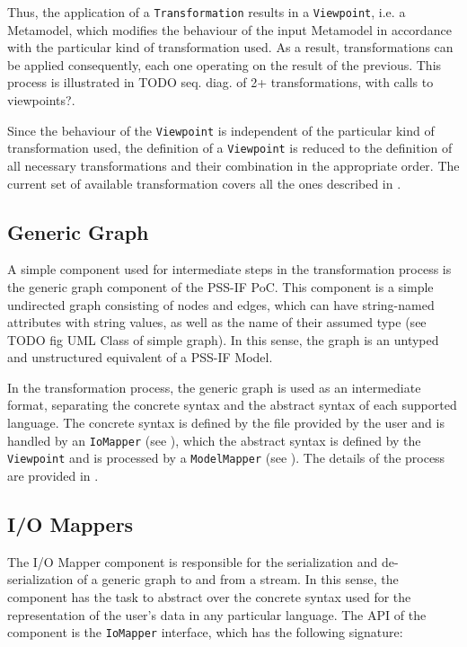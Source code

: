 Thus, the application of a \texttt{Transformation} results in a \texttt{Viewpoint}, i.e. a Metamodel, which modifies the behaviour of the input Metamodel in accordance with the particular kind of transformation used. As a result, transformations can be applied consequently, each one operating on the result of the previous. This process is illustrated in \color{red} TODO seq. diag. of 2+ transformations, with calls to viewpoints?\color{black}.

Since the behaviour of the \texttt{Viewpoint} is independent of the particular kind of transformation used, the definition of a \texttt{Viewpoint} is reduced to the definition of all necessary transformations and their combination in the appropriate order. The current set of available transformation covers all the ones described in .

\subsection{Generic Graph}

A simple component used for intermediate steps in the transformation process is the generic graph component of the PSS-IF PoC. This component is a simple undirected graph consisting of nodes and edges, which can have string-named attributes with string values, as well as the name of their assumed type (see \color{red}TODO fig UML Class of simple graph\color{black}). In this sense, the graph is an untyped and unstructured equivalent of a PSS-IF Model.

In the transformation process, the generic graph is used as an intermediate format, separating the concrete syntax and the abstract syntax of each supported language. The concrete syntax is defined by the file provided by the user and is handled by an \texttt{IoMapper} (see ), which the abstract syntax is defined by the \texttt{Viewpoint} and is processed by a \texttt{ModelMapper} (see ). The details of the process are provided in .

\subsection{I/O Mappers}
\label{sec:impl:comp:io}

The I/O Mapper component is responsible for the serialization and de-serialization of a generic graph to and from a stream. In this sense, the component has the task to abstract over the concrete syntax used for the representation of the user's data in any particular language. The API of the component is the \texttt{IoMapper} interface, which has the following signature:


